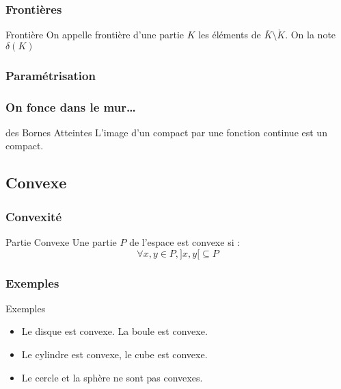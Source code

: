 \documentclass{beamercours}
\begin{document}
\begin{frame}
\frametitle{Frontières}
\vspace{-5pt}
\begin{définition}{Frontière}{}
On appelle frontière d'une partie $K$ les éléments de $\overline{K} \setminus \mathring{K}$. On la note $\delta(K)$
\end{définition}
\end{frame}
\begin{frame}
    \frametitle{Paramétrisation}

\end{frame}

\begin{frame}
\frametitle{On fonce dans le mur\dots}
\begin{théorème}{des Bornes Atteintes}{}
L'image d'un compact par une fonction continue est un compact.
\end{théorème}
\end{frame}

\subsection{Convexe}
\begin{frame}
\frametitle{Convexité}
\begin{définition}{Partie Convexe}{}
Une partie $P$ de l'espace est convexe si :
\[
    \forall x, y \in P, ]x, y[ \subseteq P
\]
\end{définition}
\end{frame}

\begin{frame}
    \frametitle{Exemples}
    \begin{propositionfr}{Exemples}{}
        \begin{itemize}[<+->]
            \item Le disque est convexe. La boule est convexe.
            \item Le cylindre est convexe, le cube est convexe.
            \item Le cercle et la sphère ne sont pas convexes.
        \end{itemize}
    \end{propositionfr}
\end{frame}
\end{document}
